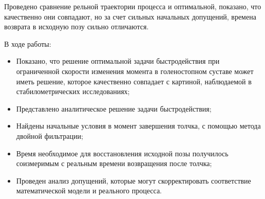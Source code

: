 \documentclass[a4paper,12pt, openany]{book}
\theoremstyle{plain} %
\theoremstyle{definition} %
\theoremstyle{remark} %
\numberwithin{equation}{chapter}
\begin{document}
{Проведено сравнение рельной траектории процесса и оптимальной, показано, что качественно они совпадают, но за счет сильных начальных допущений, времена возврата в исходную позу сильно отличаются.


В ходе работы:
\begin{itemize}
    \item Показано, что решение оптимальной задачи быстродействия при ограниченной
          скорости изменения момента в голеностопном суставе может иметь решение, которое качественно совпадает с картиной, наблюдаемой в стабилометрических исследованиях;
    \item Представлено аналитическое решение задачи быстродействия;
    \item Найдены начальные условия в момент завершения толчка, с помощью метода двойной фильтрации;
    \item Время необходимое для восстановления исходной позы получилось
          соизмеримым с реальным времени возвращения после толчка;
    \item Проведен анализ допущений, которые могут скорректировать соответствие математической модели и реального процесса.
\end{itemize}





\newpage


}
\end{document}
